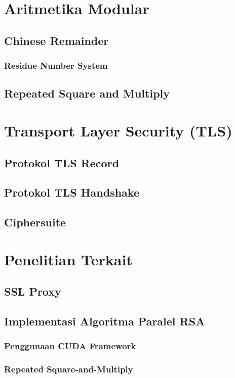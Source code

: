 \section{Aritmetika Modular}
\blindtext
\subsection{Chinese Remainder}
\blindtext
\subsubsection{Residue Number System}
\blindtext
\subsection{Repeated Square and Multiply}
\blindtext

\section{Transport Layer Security (TLS)}
\subsection{Protokol TLS Record}
\blindtext
\subsection{Protokol TLS Handshake}
\blindtext
\subsection{Ciphersuite}
\blindtext
\section{Penelitian Terkait}
\blindtext
\subsection{SSL Proxy}
\blindtext
\subsection{Implementasi Algoritma Paralel RSA}
\blindtext
\subsubsection{Penggunaan CUDA Framework}
\blindtext
\subsubsection{Repeated Square-and-Multiply}

